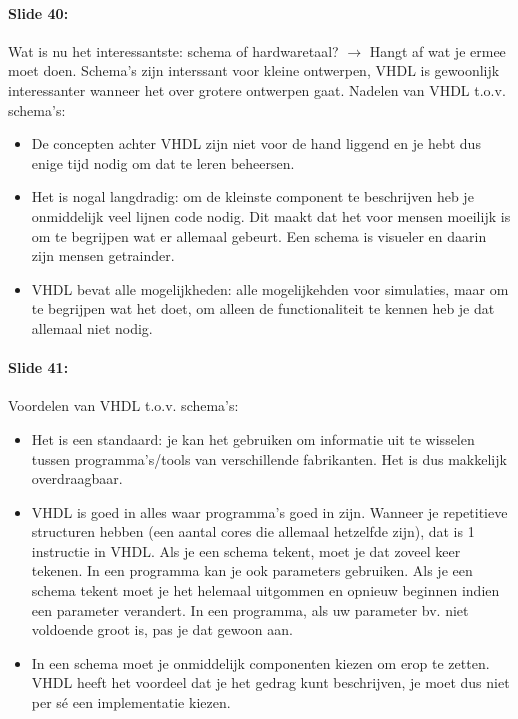 \documentclass[10pt,a4paper]{book}
\begin{document}
\paragraph{Slide 40:} Wat is nu het interessantste: schema of hardwaretaal? $\rightarrow$ Hangt af wat je ermee moet doen. Schema's zijn interssant voor kleine ontwerpen, VHDL is gewoonlijk interessanter wanneer het over grotere ontwerpen gaat.
Nadelen van VHDL t.o.v. schema's: 
\begin{itemize}
\item De concepten achter VHDL zijn niet voor de hand liggend en je hebt dus enige tijd nodig om dat te leren beheersen. 
\item Het is nogal langdradig: om de kleinste component te beschrijven heb je onmiddelijk veel lijnen code nodig. Dit maakt dat het voor mensen moeilijk is om te begrijpen wat er allemaal gebeurt. Een schema is visueler en daarin zijn mensen getrainder.
\item VHDL bevat alle mogelijkheden: alle mogelijkehden voor simulaties, maar om te begrijpen wat het doet, om alleen de functionaliteit te kennen heb je dat allemaal niet nodig.
\end{itemize}

\paragraph{Slide 41:} Voordelen van VHDL t.o.v. schema's:
\begin{itemize} 
\item Het is een standaard: je kan het gebruiken om informatie uit te wisselen tussen programma's/tools van verschillende fabrikanten. Het is dus makkelijk overdraagbaar.
\item VHDL is goed in alles waar programma's goed in zijn. Wanneer je repetitieve structuren hebben (een aantal cores die allemaal hetzelfde zijn), dat is 1 instructie in VHDL. Als je een schema tekent, moet je dat zoveel keer tekenen. In een programma kan je ook parameters gebruiken. Als je een schema tekent moet je het helemaal uitgommen en opnieuw beginnen indien een parameter verandert. In een programma, als uw parameter bv. niet voldoende groot is, pas je dat gewoon aan.
\item In een schema moet je onmiddelijk componenten kiezen om erop te zetten. VHDL heeft het voordeel dat je het gedrag kunt beschrijven, je moet dus niet per s\'e een implementatie kiezen.
\end{itemize}
\end{document}
